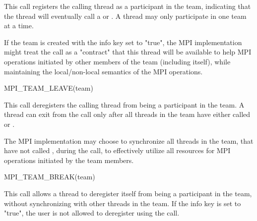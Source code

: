 
This call registers the calling thread as a participant in the team,
indicating that the thread will eventually call a
 or
.
A thread may only participate in one team at a time.

\begin{users}
If the team is created with the info key  set to "true", the
MPI implementation might treat the
 call as a "contract"
that this thread will be available to help MPI operations initiated
by other members of the team (including itself), while maintaining
the local/non-local semantics of the MPI operations.
\end{users}

\begin{funcdef}{MPI\_TEAM\_LEAVE(team)}
\end{funcdef}



This call deregisters the calling thread from being a participant
in the team. A thread can exit from the
 call only
after all threads in the team have either called
 or
.

\begin{users}
The MPI implementation may choose to synchronize all threads in the
team, that have not called 
, during the
call, to effectively utilize all resources for MPI operations initiated
by the team members.
\end{users}

\begin{funcdef}{MPI\_TEAM\_BREAK(team)}
\end{funcdef}



This call allows a thread to deregister itself from being a participant
in the team, without synchronizing with other threads in the team. If
the info key  is set to "true", the user is not allowed to deregister
using the 
 call.

